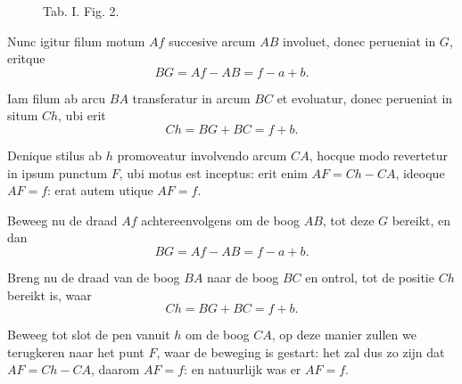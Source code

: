\documentclass[10pt,a4paper]{article}
\begin{document}
\begin{paracol}{2}
\begin{enumerate}[topsep=1px]
\begin{figure}[h]
{}
			\selectfont
			\caption{Tab. I. Fig. 2.}
		\end{figure}
		
		\switchcolumn*
		
		\par Nunc igitur filum motum $Af$ succesive arcum $AB$ involuet, donec perueniat in $G$, eritque
		\[
			BG = Af - AB = f-a+b.
		\]
		\par Iam filum ab arcu $BA$ transferatur in arcum $BC$ et evoluatur, donec perueniat in situm $Ch$, ubi erit
		\[
			Ch = BG + BC = f+b.
		\]
		\par Denique stilus ab $h$ promoveatur involvendo arcum $CA$, hocque modo revertetur in ipsum punctum $F$, ubi motus est inceptus: erit enim $AF = Ch-CA$, ideoque $AF=f$: erat autem utique $AF =f$.
		
		\switchcolumn
		
		\par Beweeg nu de draad $Af$ achtereenvolgens om de boog $AB$, tot deze $G$ bereikt, en dan
		\[
			BG = Af - AB = f-a+b.
		\]
		\par Breng nu de draad van de boog $BA$ naar de boog $BC$ en ontrol, tot de positie $Ch$ bereikt is, waar
		\[
			Ch = BG + BC = f+b.
		\]
		\par Beweeg tot slot de pen vanuit $h$ om de boog $CA$, op deze manier zullen we terugkeren naar het punt $F$, waar de beweging is gestart:  het zal dus zo zijn dat $AF = Ch-CA$, daarom $AF=f$: en natuurlijk was er $AF =f$.
		
		\switchcolumn*	
		

\end{enumerate}
\end{paracol}
\end{document}
